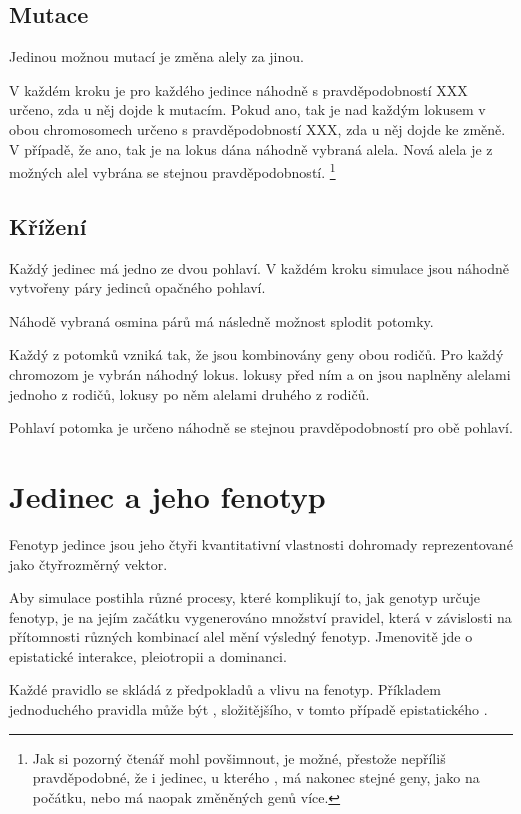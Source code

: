 \subsection{Mutace}

Jedinou možnou mutací je změna alely za jinou.

V každém kroku je pro každého jedince náhodně s pravděpodobností XXX určeno, zda u něj dojde k mutacím. Pokud ano, tak je nad každým lokusem v obou chromosomech určeno s pravděpodobností XXX, zda u něj dojde ke změně. V případě, že ano, tak je na lokus dána náhodně vybraná alela. Nová alela je z možných alel vybrána se stejnou pravděpodobností.
\footnote{Jak si pozorný čtenář mohl povšimnout, je možné, přestože nepříliš pravděpodobné, že i jedinec, u kterého , má nakonec stejné geny, jako na počátku, nebo má naopak změněných genů více.}
\subsection{Křížení}

Každý jedinec má jedno ze dvou pohlaví. V každém kroku simulace jsou náhodně vytvořeny páry jedinců opačného pohlaví.

Náhodě vybraná osmina párů má následně možnost splodit potomky.

Každý z potomků vzniká tak, že jsou kombinovány geny obou rodičů. Pro každý chromozom je vybrán náhodný lokus. lokusy před ním a on jsou naplněny alelami jednoho z rodičů, lokusy po něm alelami druhého z rodičů.

Pohlaví potomka je určeno náhodně se stejnou pravděpodobností pro obě pohlaví.


\section{Jedinec a jeho fenotyp}

Fenotyp jedince jsou jeho čtyři kvantitativní vlastnosti dohromady reprezentované jako čtyřrozměrný vektor.

Aby simulace postihla různé procesy, které komplikují to, jak genotyp určuje fenotyp, je na jejím začátku vygenerováno množství pravidel, která v závislosti na přítomnosti různých kombinací alel mění výsledný fenotyp. Jmenovitě jde o epistatické interakce, pleiotropii a dominanci.

Každé pravidlo se skládá z předpokladů a vlivu na fenotyp. Příkladem jednoduchého pravidla může být , složitějšího, v tomto případě epistatického  .

